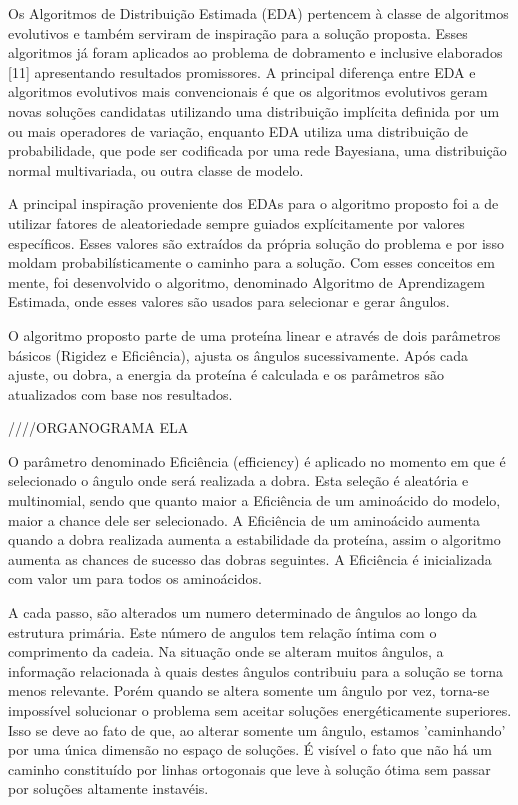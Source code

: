 \documentclass[dm,ppgcomp]{texfurg}
\begin{document}
Os Algoritmos de Distribuição Estimada (EDA) pertencem à classe de algoritmos evolutivos e também serviram de inspiração para a solução proposta. Esses algoritmos já foram aplicados ao problema de dobramento e inclusive elaborados [11] apresentando resultados promissores. A principal diferença entre EDA e algoritmos evolutivos mais convencionais é que os algoritmos evolutivos geram novas soluções candidatas utilizando uma distribuição implícita definida por um ou mais operadores de variação, enquanto EDA utiliza uma distribuição de probabilidade, que pode ser codificada por uma rede Bayesiana, uma distribuição normal multivariada, ou outra classe de modelo.

A principal inspiração proveniente dos EDAs para o algoritmo proposto foi a de utilizar fatores de aleatoriedade sempre guiados explícitamente por valores específicos. Esses valores são extraídos da própria solução do problema e por isso moldam probabilísticamente o caminho para a solução. Com esses conceitos em mente, foi desenvolvido o algoritmo, denominado Algoritmo de Aprendizagem Estimada, onde esses valores são usados para selecionar e gerar ângulos. 

O algoritmo proposto parte de uma proteína linear e através de dois parâmetros básicos (Rigidez e Eficiência), ajusta os ângulos sucessivamente. Após cada ajuste, ou dobra, a energia da proteína é calculada e os parâmetros são atualizados com base nos resultados.



////ORGANOGRAMA ELA



O parâmetro denominado Eficiência (efficiency) é aplicado no momento em que é selecionado o ângulo onde será realizada a dobra. Esta seleção é aleatória e multinomial, sendo que quanto maior a Eficiência de um aminoácido do modelo, maior a chance dele ser selecionado. A Eficiência de um aminoácido aumenta quando a dobra realizada aumenta a estabilidade da proteína, assim o algoritmo aumenta as chances de sucesso das dobras seguintes. A Eficiência é inicializada com valor um para todos os aminoácidos. 

A cada passo, são alterados um numero determinado de ângulos ao longo da estrutura primária. Este número de angulos tem relação íntima com o comprimento da cadeia. Na situação onde se alteram muitos ângulos, a informação relacionada à quais destes ângulos contribuiu para a solução se torna menos relevante. Porém quando se altera somente um ângulo por vez, torna-se impossível solucionar o problema sem aceitar soluções energéticamente superiores. Isso se deve ao fato de que, ao alterar somente um ângulo, estamos 'caminhando' por uma única dimensão no espaço de soluções. É visível o fato que não há um caminho constituído por linhas ortogonais que leve à solução ótima sem passar por soluções altamente instavéis.
\end{document}
